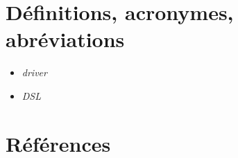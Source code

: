 \section{Définitions, acronymes, abréviations}

\begin{itemize}
\itemsep1pt\parskip0pt
\item
  \emph{driver}
\item
  \emph{DSL}
\end{itemize}

\section{Références}
